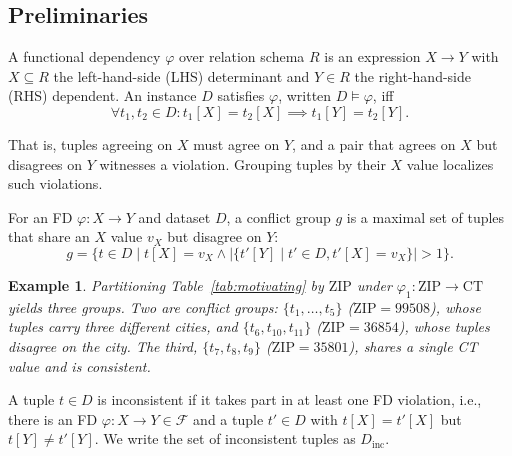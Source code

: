\documentclass[sigconf]{acmart}
\newtheorem{example}{Example}
\begin{document}
\subsection{Preliminaries}
\label{sec:prelim}

\begin{definition}
A functional dependency $\varphi$ over relation schema $R$ is an expression $X \rightarrow Y$ with $X \subseteq R$ the left-hand-side (LHS) determinant and $Y \in R$ the right-hand-side (RHS) dependent. An instance $D$ satisfies $\varphi$, written $D \models \varphi$, iff
\begin{equation}
\forall t_1, t_2 \in D: t_1[X] = t_2[X] \implies t_1[Y] = t_2[Y].
\end{equation}
\end{definition}

That is, tuples agreeing on $X$ must agree on $Y$, and a pair that agrees on $X$ but disagrees on $Y$ witnesses a violation. Grouping tuples by their $X$ value localizes such violations.

\begin{definition}
For an FD $\varphi: X \rightarrow Y$ and dataset $D$, a conflict group $g$ is a maximal set of tuples that share an $X$ value $v_X$ but disagree on $Y$:
\begin{equation}
g = \{t \in D \mid t[X] = v_X \land |\{t'[Y] \mid t' \in D, t'[X] = v_X\}| > 1\}.
\end{equation}
\end{definition}

\begin{example}
Partitioning Table~\ref{tab:motivating} by $\text{ZIP}$ under $\varphi_1: \text{ZIP} \rightarrow \text{CT}$ yields three groups. Two are conflict groups: $\{t_1, \ldots, t_5\}$ ($\text{ZIP}=99508$), whose tuples carry three different cities, and $\{t_6, t_{10}, t_{11}\}$ ($\text{ZIP}=36854$), whose tuples disagree on the city. The third, $\{t_7, t_8, t_9\}$ ($\text{ZIP}=35801$), shares a single CT value and is consistent.
\end{example}

\begin{definition}
A tuple $t \in D$ is inconsistent if it takes part in at least one FD violation, i.e., there is an FD $\varphi: X \rightarrow Y \in \mathcal{F}$ and a tuple $t' \in D$ with $t[X] = t'[X]$ but $t[Y] \neq t'[Y]$. We write the set of inconsistent tuples as $D_{\text{inc}}$.
\end{definition}
\end{document}
